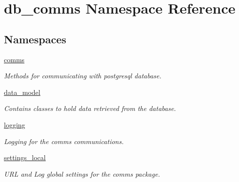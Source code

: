 \hypertarget{namespacedb__comms}{}\section{db\+\_\+comms Namespace Reference}
\label{namespacedb__comms}
\subsection*{Namespaces}
\begin{DoxyCompactItemize}
\item 
 \hyperlink{namespacedb__comms_1_1comms}{comms}
\begin{DoxyCompactList}\small\item\em Methods for communicating with postgresql database. \end{DoxyCompactList}\item 
 \hyperlink{namespacedb__comms_1_1data__model}{data\+\_\+model}
\begin{DoxyCompactList}\small\item\em Contains classes to hold data retrieved from the database. \end{DoxyCompactList}\item 
 \hyperlink{namespacedb__comms_1_1logging}{logging}
\begin{DoxyCompactList}\small\item\em Logging for the comms communications. \end{DoxyCompactList}\item 
 \hyperlink{namespacedb__comms_1_1settings__local}{settings\+\_\+local}
\begin{DoxyCompactList}\small\item\em U\+R\+L and Log global settings for the comms package. \end{DoxyCompactList}\end{DoxyCompactItemize}
